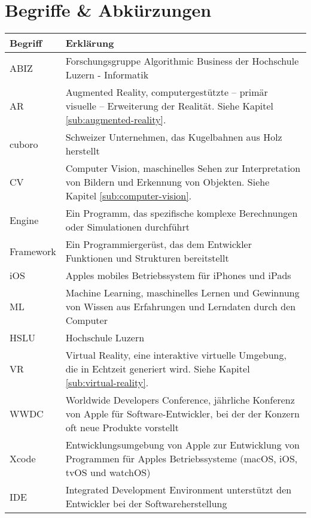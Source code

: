 \section*{Begriffe \& Abkürzungen}
\begin{table}
	\begin{tabular}{@{} p{} p{} @{}}
		\hline
		\textbf{Begriff} & \textbf{Erklärung} \\
		\hline
		ABIZ	& Forschungsgruppe Algorithmic Business der Hochschule Luzern - Informatik \\
		AR 		& Augmented Reality, computergestützte – primär visuelle – Erweiterung der Realität. Siehe Kapitel \ref{sub:augmented-reality}. \\
		cuboro	& Schweizer Unternehmen, das Kugelbahnen aus Holz herstellt \\
		CV		& Computer Vision, maschinelles Sehen zur Interpretation von Bildern und Erkennung von Objekten. Siehe Kapitel \ref{sub:computer-vision}. \\
		Engine	& Ein Programm, das spezifische komplexe Berechnungen oder Simulationen durchführt \\
		Framework	& Ein Programmiergerüst, das dem Entwickler Funktionen und Strukturen bereitstellt \\
		iOS		& Apples mobiles Betriebssystem für iPhones und iPads \\
		ML		& Machine Learning, maschinelles Lernen und Gewinnung von Wissen aus Erfahrungen und Lerndaten durch den Computer \\
		HSLU	& Hochschule Luzern \\
		VR		& Virtual Reality, eine interaktive virtuelle Umgebung, die in Echtzeit generiert wird. Siehe Kapitel \ref{sub:virtual-reality}. \\
		WWDC	& Worldwide Developers Conference, jährliche Konferenz von Apple für Software-Entwickler, bei der der Konzern oft neue Produkte vorstellt \\
		Xcode	& Entwicklungsumgebung von Apple zur Entwicklung von Programmen für Apples Betriebssysteme (macOS, iOS, tvOS und watchOS) \\
		IDE 	& Integrated Development Environment unterstützt den Entwickler bei der Softwareherstellung \\
		\hline
	\end{tabular}
\end{table}
